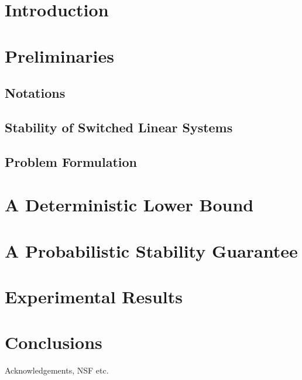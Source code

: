 \documentclass[twocolumn]{autart}
\begin{document}
\section{Introduction}


\section{Preliminaries}\label{sec:preliminaries}
\subsection{Notations}
 
\subsection{Stability of Switched Linear Systems}\label{sec:stab}

\subsection{Problem Formulation}


\section{A Deterministic Lower Bound}\label{sec:lowerBound}


\section{A Probabilistic Stability Guarantee}\label{sec:upperbound}



\section{Experimental Results}\label{sec:experiments}


\section{Conclusions}\label{sec:conclusions}



\begin{ack}                               %
Acknowledgements, NSF etc.  %
\end{ack}

 


\appendix\label{appendix}

\end{document}
